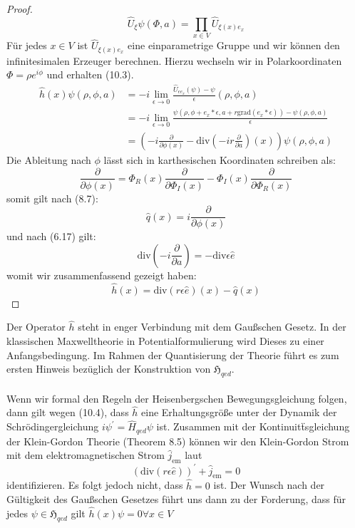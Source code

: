 \documentclass[11pt,a4paper,leqno]{report}
\numberwithin{equation}{chapter}
\begin{document}
\begin{proof}
\begin{equation*}
	\hat{U}_\xi\psi(\Phi, a) = \prod_{x\in V}\hat{U}_{\xi(x)e_x}
\end{equation*}
F\"ur jedes $x\in V$ ist $\hat{U}_{\xi(x)e_x}$ eine einparametrige Gruppe und wir k\"onnen den infinitesimalen Erzeuger berechnen. Hierzu wechseln wir in Polarkoordinaten $\Phi=\rho e^{i\phi}$ und erhalten (10.3). 
\begin{align*}
	\hat{h}(x)\psi(\rho, \phi, a) &=-i\lim_{\epsilon\rightarrow 0}\frac{\hat{U}_{\epsilon e_x}(\psi)-\psi}{\epsilon}(\rho, \phi, a) \\
	&=-i\lim_{\epsilon\rightarrow 0}\frac{\psi(\rho, \phi + e_x*\epsilon, a + r \text{grad}(e_x*\epsilon))-\psi(\rho, \phi, a)}{\epsilon} \\
	&=(-i\frac{\partial}{\partial\phi(x)}-\text{div}(-ir\frac{\partial}{\partial a})(x))\psi(\rho, \phi, a)
\end{align*}
Die Ableitung nach $\phi$ l\"asst sich in karthesischen Koordinaten schreiben als:
\begin{equation*}
	\frac{\partial}{\partial\phi(x)}=\Phi_{R}(x)\frac{\partial}{\partial \Phi_I(x)}-\Phi_{I}(x)\frac{\partial}{\partial \Phi_R(x)}
\end{equation*}
somit gilt nach (8.7):
\begin{equation*}
	\hat{q}(x)=i\frac{\partial}{\partial\phi(x)}
\end{equation*}
und nach (6.17)  gilt:
\begin{equation*}
	\text{div}(-i\frac{\partial}{\partial a}) = -\text{div}\epsilon \hat{e}
\end{equation*}
womit wir zusammenfassend gezeigt haben:
\begin{equation*}
\hat{h}(x) = \text{div}(r\epsilon \hat{e})(x)-\hat{q}(x)
\end{equation*}

\end{proof}
\noindent
Der Operator $\hat{h}$ steht in enger Verbindung mit dem Gau\ss{}schen Gesetz. In der klassischen Maxwelltheorie in Potentialformulierung wird Dieses zu einer Anfangsbedingung. Im Rahmen der Quantisierung der Theorie f\"uhrt es zum ersten Hinweis bez\"uglich der Konstruktion von $\mathfrak{H}_{qed}$. \\
\\
Wenn wir formal den Regeln der Heisenbergschen Bewegungsgleichung folgen, dann gilt wegen (10.4), dass $\hat{h}$ eine Erhaltungsgr\"o\ss{}e unter der Dynamik der Schr\"odingergleichung $i\psi^\prime=\hat{H}_{qed}\psi$ ist. Zusammen mit der Kontinuit\"tsgleichung der Klein-Gordon Theorie (Theorem 8.5) k\"onnen wir den Klein-Gordon Strom mit dem elektromagnetischen Strom $\hat{j}_{\text{em}}$ laut \begin{equation}
(\text{div}(r\epsilon \hat{e}))^\prime + \hat{j}_{\text{em}}=0
\end{equation} identifizieren.  Es folgt jedoch nicht, dass $\hat{h}=0$ ist. Der Wunsch nach der G\"ultigkeit des Gau\ss{}schen Gesetzes f\"uhrt uns dann zu der Forderung, dass f\"ur jedes $\psi\in\mathfrak{H}_{qed}$ gilt $\hat{h}(x)\psi = 0\forall x\in V$\\
\end{document}
